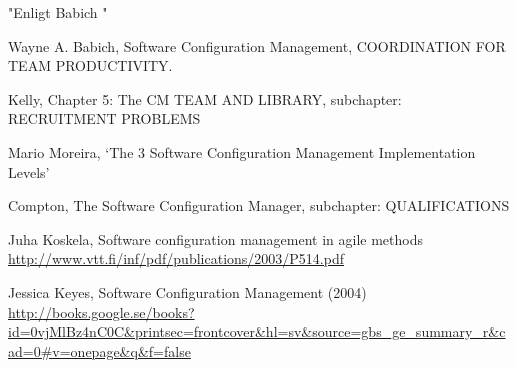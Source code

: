 \documentclass[10pt]{article}
\begin{document}
"Enligt Babich \cite{Babich}"


\begin{thebibliography}{1}

 Wayne A. Babich, Software Configuration Management, COORDINATION FOR TEAM PRODUCTIVITY.

 Kelly, Chapter 5: The CM TEAM AND LIBRARY, subchapter: RECRUITMENT PROBLEMS 

 Mario Moreira, ‘The 3 Software Configuration Management Implementation Levels’

Compton, The Software Configuration Manager, subchapter: QUALIFICATIONS

Juha Koskela, Software configuration management in agile methods
\url{http://www.vtt.fi/inf/pdf/publications/2003/P514.pdf}

 Jessica Keyes, Software Configuration Management (2004) \url{http://books.google.se/books?id=0vjMlBz4nC0C&printsec=frontcover&hl=sv&source=gbs_ge_summary_r&cad=0#v=onepage&q&f=false}
\end{thebibliography}
\end{document}
